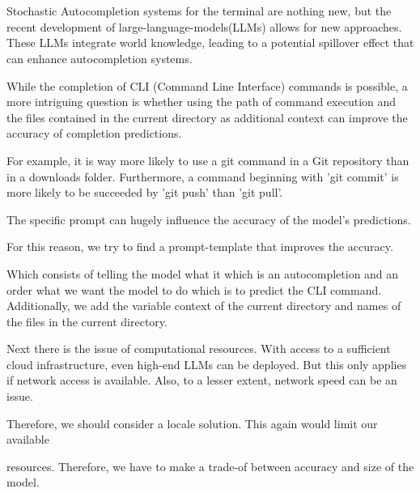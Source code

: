 \section*{}



Stochastic Autocompletion systems for the terminal are nothing new, but the recent development of large-language-models(LLMs) allows for new approaches. These LLMs integrate world knowledge, leading to a potential spillover effect that can enhance autocompletion systems.



While the completion of CLI (Command Line Interface) commands is possible, a more intriguing question is whether using the path of command execution and the files contained in the current directory as additional context can improve the accuracy of completion predictions.


For  example, it is way more likely to use a git command in a Git repository than in a downloads folder. Furthermore, a command beginning with 'git commit' is more likely to be succeeded by 'git push' than 'git pull'.



The specific prompt can hugely influence the accuracy of the model's predictions.

For this reason, we try to find a prompt-template that improves the accuracy.

Which consists of telling the model what it which is an autocompletion and an order what we want the model to do which is to predict the CLI command. Additionally, we add the variable context of the current directory and names of the files in the current directory. 



Next there is the issue of computational resources. With access to a sufficient cloud infrastructure, even high-end LLMs can be deployed. But this only applies if network access is available. Also, to a lesser extent, network speed can be an issue. 

Therefore, we should consider a locale solution. This  again would limit our available 

resources. Therefore, we have to make a trade-of between accuracy and size of the model.

